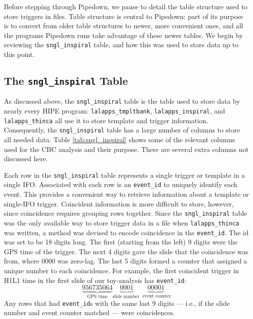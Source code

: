 Before stepping through Pipedown, we pause to detail the table structure used to store triggers in files. Table structure is central to Pipedown: part of its purpose is to convert from older table structures to newer, more convenient ones, and all the programs Pipedown runs take advantage of these newer tables. We begin by reviewing the \texttt{sngl\_inspiral} table, and how this was used to store data up to this point.

\subsection{The \texttt{sngl\_inspiral} Table}

As discussed above, the \texttt{sngl\_inspiral} table is the table used to store data by nearly every \ac{HIPE} program: \texttt{lalapps\_tmpltbank}, \texttt{lalapps\_inspiral}, and \texttt{lalapps\_thinca} all use it to store template and trigger information. Consequently, the \texttt{sngl\_inspiral} table has a large number of columns to store all needed data. Table \ref{tab:sngl_inspiral} shows some of the relevant columns used for the \ac{CBC} analysis and their purpose. There are several extra columns not discussed here.

Each row in the \texttt{sngl\_inspiral} table represents a single trigger or template in a single \ac{IFO}. Associated with each row is an \texttt{event\_id} to uniquely identify each event. This provides a convenient way to retrieve information about a template or single-\ac{IFO} trigger. Coincident information is more difficult to store, however, since coincidence requires grouping rows together. Since the \texttt{sngl\_inspiral} table was the only available way to store trigger data in a file when \texttt{lalapps\_thinca} was written, a method was devised to encode coincidence in the \texttt{event\_id}. The id was set to be 18 digits long. The first (starting from the left) 9 digits were the GPS time of the trigger. The next 4 digits gave the slide that the coincidence was from, where $0000$ was zero-lag. The last 5 digits formed a counter that assigned a unique number to each coincidence. For example, the first coincident trigger in H1L1 time in the first slide of our toy-analysis has \texttt{event\_id}:
\begin{equation*}
\underbrace{956735064}_{\text{GPS time}}\underbrace{0001}_{\text{slide number~}}\underbrace{00001}_{\text{~event counter}}
\end{equation*}
Any rows that had \texttt{event\_id}s with the same last 9 digits --- i.e., if the slide number and event counter matched --- were coincidences.


